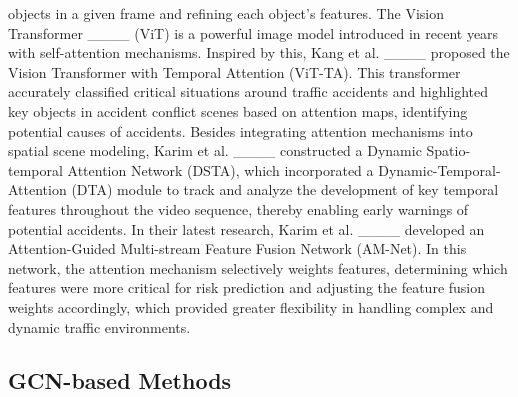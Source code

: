 objects in a given frame and refining each object's features. The Vision Transformer ____ (ViT) is a powerful image model introduced in recent years with self-attention mechanisms. Inspired by this, Kang et al. ____ proposed the Vision Transformer with Temporal Attention (ViT-TA). This transformer accurately classified critical situations around traffic accidents and highlighted key objects in accident conflict scenes based on attention maps, identifying potential causes of accidents. Besides integrating attention mechanisms into spatial scene modeling, Karim et al. ____ constructed a Dynamic Spatio-temporal Attention Network (DSTA), which incorporated a Dynamic-Temporal-Attention (DTA) module to track and analyze the development of key temporal features throughout the video sequence, thereby enabling early warnings of potential accidents. In their latest research, Karim et al. ____ developed an Attention-Guided Multi-stream Feature Fusion Network (AM-Net). In this network, the attention mechanism selectively weights features, determining which features were more critical for risk prediction and adjusting the feature fusion weights accordingly, which provided greater flexibility in handling complex and dynamic traffic environments.

\subsection{GCN-based Methods}

